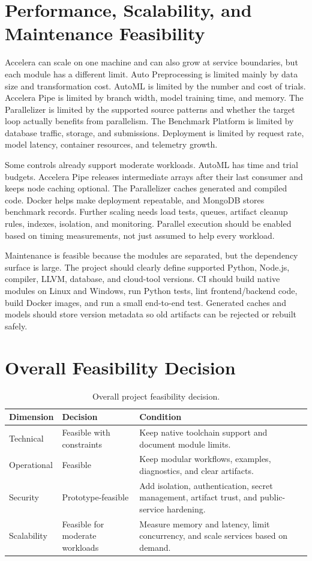 \documentclass[12pt,a4paper]{report}
\newcommand{\acceleraTableStyle}{%
\small
\renewcommand{\arraystretch}{1.15}
\setlength{\tabcolsep}{4pt}%
}
\begin{document}
\section{Performance, Scalability, and Maintenance Feasibility}
Accelera can scale on one machine and can also grow at service boundaries, but
each module has a different limit. Auto Preprocessing is limited mainly by data
size and transformation cost. AutoML is limited by the number and cost of trials.
Accelera Pipe is limited by branch width, model training time, and memory. The
Parallelizer is limited by the supported source patterns and whether the target
loop actually benefits from parallelism. The Benchmark Platform is limited by
database traffic, storage, and submissions. Deployment is limited by request
rate, model latency, container resources, and telemetry growth.

Some controls already support moderate workloads. AutoML has time and trial
budgets. Accelera Pipe releases intermediate arrays after their last consumer and
keeps node caching optional. The Parallelizer caches generated and compiled code.
Docker helps make deployment repeatable, and MongoDB stores benchmark records.
Further scaling needs load tests, queues, artifact cleanup rules, indexes,
isolation, and monitoring. Parallel execution should be enabled based on timing
measurements, not just assumed to help every workload.

Maintenance is feasible because the modules are separated, but the dependency
surface is large. The project should clearly define supported Python, Node.js,
compiler, LLVM, database, and cloud-tool versions. CI should build native modules
on Linux and Windows, run Python tests, lint frontend/backend code, build Docker
images, and run a small end-to-end test. Generated caches and models should store
version metadata so old artifacts can be rejected or rebuilt safely.

\section{Overall Feasibility Decision}
\begin{table}[H]
\centering
\caption{Overall project feasibility decision.}
\label{tab:overall-feasibility-decision}
\acceleraTableStyle
\begin{tabularx}{\textwidth}{p{} p{} X}
\toprule
\textbf{Dimension} & \textbf{Decision} & \textbf{Condition} \\
\midrule
Technical & Feasible with constraints & Keep native toolchain support and
document module limits. \\
\hline
Operational & Feasible & Keep modular workflows, examples, diagnostics, and
clear artifacts. \\
\hline
Security & Prototype-feasible & Add isolation, authentication, secret management,
artifact trust, and public-service hardening. \\
\hline
Scalability & Feasible for moderate workloads & Measure memory and latency,
limit concurrency, and scale services based on demand. \\
\bottomrule
\end{tabularx}
\end{table}
\end{document}
